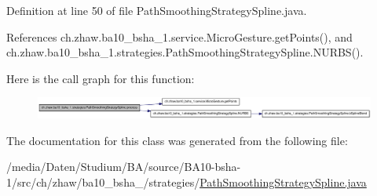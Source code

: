Definition at line 50 of file PathSmoothingStrategySpline.java.

References ch.zhaw.ba10\_\-bsha\_\-1.service.MicroGesture.getPoints(), and ch.zhaw.ba10\_\-bsha\_\-1.strategies.PathSmoothingStrategySpline.NURBS().

Here is the call graph for this function:\nopagebreak
\begin{figure}[H]
\begin{center}
\leavevmode
\includegraphics[width=420pt]{classch_1_1zhaw_1_1ba10__bsha__1_1_1strategies_1_1PathSmoothingStrategySpline_ad3e6346b66b88e50ce7c985ff3d99644_cgraph}
\end{center}
\end{figure}


The documentation for this class was generated from the following file:\begin{DoxyCompactItemize}
\item 
/media/Daten/Studium/BA/source/BA10-\/bsha-\/1/src/ch/zhaw/ba10\_\-bsha\_/strategies/\hyperlink{PathSmoothingStrategySpline_8java}{PathSmoothingStrategySpline.java}\end{DoxyCompactItemize}

